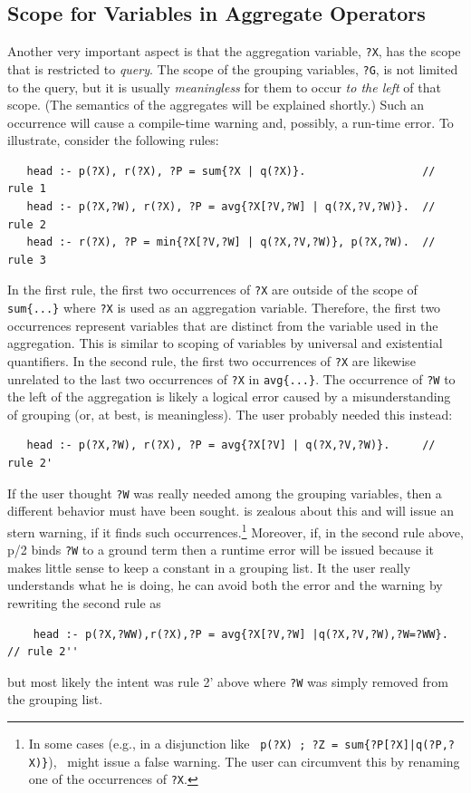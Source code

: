 \documentclass[11pt]{article}
\newcommand{\ERGO}{\mbox{\smaller{\ensuremath{\cal{E}}\smaller{{\sc{RGO}}}}}\xspace}
\newcommand{\FLSYSTEM}{\ERGO}
\begin{document}
\subsection{Scope for Variables in Aggregate Operators}

Another very important aspect is that 
the aggregation variable, \texttt{?X}, 
has the scope that is restricted to \emph{query}.
The scope of the grouping variables, \texttt{?G}, is not limited to the query,
but it is usually \emph{meaningless} for them to occur \emph{to
  the left} of that scope. (The semantics of the aggregates will be
explained shortly.)
Such an occurrence will cause a compile-time warning and, possibly, a
run-time error.
To illustrate, consider the following rules:
\begin{verbatim}
   head :- p(?X), r(?X), ?P = sum{?X | q(?X)}.                  // rule 1
   head :- p(?X,?W), r(?X), ?P = avg{?X[?V,?W] | q(?X,?V,?W)}.  // rule 2
   head :- r(?X), ?P = min{?X[?V,?W] | q(?X,?V,?W)}, p(?X,?W).  // rule 3
\end{verbatim}
In the first rule,
the first two occurrences of \texttt{?X}
are outside of the
scope of \texttt{sum\{...\}}  where \texttt{?X} is used as an aggregation
variable. Therefore, the first two occurrences represent
variables that are distinct from
the variable used in the aggregation. This is similar to
scoping of variables by universal and existential quantifiers. 
In the second rule, the first two occurrences of \texttt{?X} are likewise
unrelated to the last two
occurrences of \texttt{?X} in \texttt{avg\{...\}}.
The occurrence of \texttt{?W} to the left of the aggregation is likely a logical
error caused by a misunderstanding of grouping
(or, at best, is meaningless). The user probably needed
this instead:
\begin{verbatim}
   head :- p(?X,?W), r(?X), ?P = avg{?X[?V] | q(?X,?V,?W)}.     // rule 2'
\end{verbatim}
If the user thought \texttt{?W} was really needed among the grouping variables,
then a different behavior must have been sought.
\FLSYSTEM is zealous about this and will issue an stern warning, if it
finds such occurrences.\footnote{
  In some cases (e.g., in a disjunction like~
  \texttt{p(?X) ; ?Z = sum\{?P[?X]|q(?P,?X)\}}),~
  \FLSYSTEM might issue a false warning. The user can
  circumvent this by renaming one of the occurrences of \texttt{?X}. 
}
Moreover, if, in the second rule above, p/2 binds \texttt{?W} to a ground term
then a runtime error will be issued because it makes little sense to
keep a constant in a grouping list. It the user really understands what he
is doing, he can avoid both the error and the warning by rewriting the
second rule as
\begin{verbatim}
    head :- p(?X,?WW),r(?X),?P = avg{?X[?V,?W] |q(?X,?V,?W),?W=?WW}. // rule 2''
\end{verbatim}
but most likely the intent was rule 2' above where \texttt{?W} was simply
removed from the grouping list. 
\end{document}
